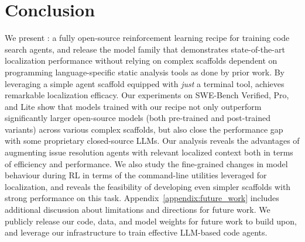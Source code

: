 \section{Conclusion}
We present \methodname: a fully open-source reinforcement learning recipe for training code search agents, and release the \methodname model family that demonstrates state-of-the-art localization performance without relying on complex scaffolds dependent on programming language-specific static analysis tools as done by prior work. By leveraging a simple agent scaffold equipped with \emph{just} a terminal tool, \methodname achieves remarkable localization efficacy. Our experiments on SWE-Bench Verified, Pro, and Lite show that models trained with our recipe not only outperform significantly larger open-source models (both pre-trained and post-trained variants) across various complex scaffolds, but also close the performance gap with some proprietary closed-source LLMs. Our analysis reveals the advantages of augmenting issue resolution agents with relevant localized context both in terms of efficiency and performance. We also study the fine-grained changes in model behaviour during RL in terms of the command-line utilities leveraged for localization, and reveals the feasibility of developing even simpler scaffolds with strong performance on this task. Appendix~\ref{appendix:future_work} includes additional discussion about limitations and directions for future work. We publicly release our code, data, and model weights for future work to build upon, and leverage our infrastructure to train effective LLM-based code agents.